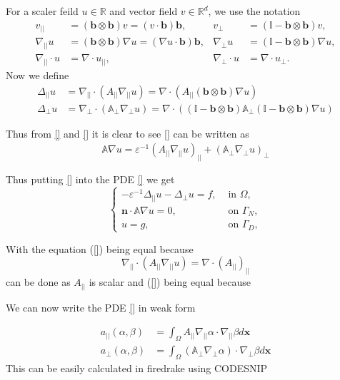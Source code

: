 \documentclass[12pt,a4paper]{article}
\begin{document}
For a scaler feild $u\in\mathbb{R}$ and vector field $v \in \mathbb{R}^d$, we use the notation
\begin{align}
v_{||} &=(\mathbf{b} \otimes \mathbf{b})v = (v \cdot \mathbf{b})\mathbf{b}
, & v_{\perp} &= (\mathbb{I}-\mathbf{b} \otimes \mathbf{b})v,\\
\nabla_{||}u &= (\mathbf{b} \otimes \mathbf{b}) \nabla u = (\nabla u \cdot \mathbf{b})\mathbf{b},
& \nabla_{\perp} u &= (\mathbb{I}-\mathbf{b} \otimes \mathbf{b}) \nabla u,\\
\nabla_{||} \cdot u &= \nabla \cdot u_{||},
& \nabla_{\perp} \cdot u &= \nabla \cdot u_{\perp}.
\end{align}
Now we define 
\begin{align}
\Delta_{||}u &= \nabla_{||}\cdot(A_{||}\nabla_{||}u)  =
\nabla \cdot(A_{||} (\mathbf{b} \otimes \mathbf{b}) \nabla u)\\
\Delta_{\perp}u  &= \nabla_{\perp}\cdot(\mathbb{A}_{\perp}\nabla_{\perp}u)  = 
\nabla \cdot((\mathbb{I}-\mathbf{b} \otimes \mathbf{b})\mathbb{A}_{\perp}(\mathbb{I}-\mathbf{b} \otimes \mathbf{b})\nabla u)
\end{align}

Thus from \ref{} and \ref{} it is clear to see \ref{} can be written as
\begin{align}
\mathbb{A} \nabla u = 
\varepsilon^{-1}(A_{||}\nabla_{||} u)_{||} + 
(\mathbb{A}_{\perp}\nabla_{\perp}u)_{\perp} \\
 \\
\end{align}
Thus putting \ref{} into the PDE \ref{} we get
\begin{equation}
\begin{cases}
-\varepsilon^{-1} \Delta_{||}u - \Delta_{\perp}u = f, & \text{ in }\Omega,\\
\mathbf{n}\cdot \mathbb{A}\nabla u = 0, & \text{ on }\Gamma_N, \\
u = g, & \text{  on }\Gamma_D,
\end{cases}
\end{equation}

With the equation (\ref{}) being equal because
\begin{equation}
\nabla_{||}\cdot(A_{||}\nabla_{||}u) = 
\nabla \cdot (A_{||})_{||} 
\end{equation}
can be done as $A_{||}$ is scalar
and (\ref{}) being equal because 

We can now write the PDE \ref{} in weak form

\begin{align}
a_{||}(\alpha, \beta) &= \int_{\Omega} A_{||} \nabla_{||}\alpha \cdot \nabla_{||}\beta d\mathbf{x} \\
a_{\perp}(\alpha, \beta) &= \int_{\Omega}(\mathbb{A}_{\perp} \nabla_{\perp}\alpha )\cdot \nabla_{\perp} \beta d\mathbf{x}
\end{align}
This can be easily calculated in firedrake using
CODESNIP
\end{document}

